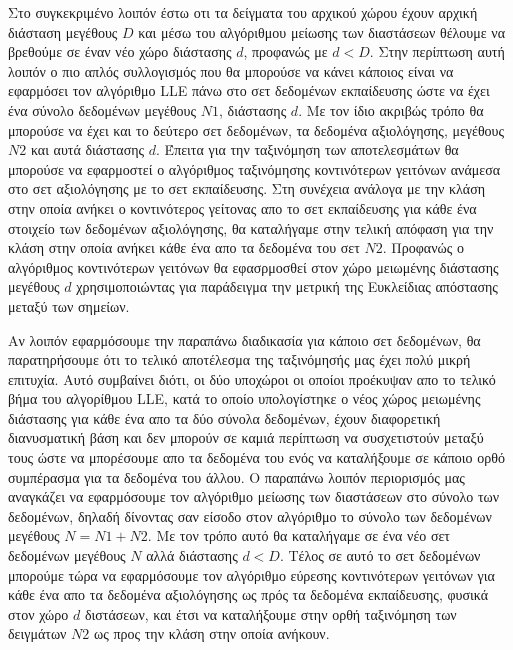 \par
Στο συγκεκριμένο λοιπόν έστω οτι τα δείγματα του αρχικού χώρου έχουν αρχική διάσταση μεγέθους $D$ και μέσω του αλγόριθμου μείωσης των διαστάσεων θέλουμε να βρεθούμε σε έναν νέο χώρο διάστασης $d$, προφανώς με $d < D$. Στην περίπτωση αυτή λοιπόν ο πιο απλός συλλογισμός που θα μπορούσε να κάνει κάποιος είναι να εφαρμόσει τον αλγόριθμο \textlatin{LLE} πάνω στο σετ δεδομένων εκπαίδευσης ώστε να έχει ένα σύνολο δεδομένων μεγέθους $Ν1$, διάστασης $d$. Με τον ίδιο ακριβώς τρόπο θα μπορούσε να έχει και το δεύτερο σετ δεδομένων, τα δεδομένα αξιολόγησης, μεγέθους $N2$ και αυτά διάστασης $d$. Έπειτα για την ταξινόμηση των αποτελεσμάτων θα μπορούσε να εφαρμοστεί ο αλγόριθμος ταξινόμησης κοντινότερων γειτόνων ανάμεσα στο σετ αξιολόγησης με το σετ εκπαίδευσης. Στη συνέχεια ανάλογα με την κλάση στην οποία ανήκει ο κοντινότερος γείτονας απο το σετ εκπαίδευσης για κάθε ένα στοιχείο των δεδομένων αξιολόγησης, θα καταλήγαμε στην τελική απόφαση για την κλάση στην οποία ανήκει κάθε ένα απο τα δεδομένα του σετ $N2$. Προφανώς ο αλγόριθμος κοντινότερων γειτόνων θα εφασρμοσθεί στον χώρο μειωμένης διάστασης μεγέθους $d$ χρησιμοποιώντας για παράδειγμα την μετρική της Ευκλείδιας απόστασης μεταξύ των σημείων.
\par
Αν λοιπόν εφαρμόσουμε την παραπάνω διαδικασία για κάποιο σετ δεδομένων, θα παρατηρήσουμε ότι το τελικό αποτέλεσμα της ταξινόμησής μας έχει πολύ μικρή επιτυχία. Αυτό συμβαίνει διότι, οι δύο υποχώροι οι οποίοι προέκυψαν απο το τελικό βήμα του αλγορίθμου \textlatin{LLE}, κατά το οποίο υπολογίστηκε ο νέος χώρος μειωμένης διάστασης για κάθε ένα απο τα δύο σύνολα δεδομένων, έχουν διαφορετική διανυσματική βάση και δεν μπορούν σε καμιά περίπτωση να συσχετιστούν μεταξύ τους ώστε να μπορέσουμε απο τα δεδομένα του ενός να καταλήξουμε σε κάποιο ορθό συμπέρασμα για τα δεδομένα του άλλου. Ο παραπάνω λοιπόν περιορισμός μας αναγκάζει να εφαρμόσουμε τον αλγόριθμο μείωσης των διαστάσεων στο σύνολο των δεδομένων, δηλαδή δίνοντας σαν είσοδο στον αλγόριθμο το σύνολο των δεδομένων μεγέθους $N = N1+N2$. Με τον τρόπο αυτό θα καταλήγαμε σε ένα νέο σετ δεδομένων μεγέθους $N$ αλλά διάστασης $d < D$. Τέλος σε αυτό το σετ δεδομένων μπορούμε τώρα να εφαρμόσουμε τον αλγόριθμο εύρεσης κοντινότερων γειτόνων για κάθε ένα απο τα δεδομένα αξιολόγησης ως πρός τα δεδομένα εκπαίδευσης, φυσικά στον χώρο $d$ διστάσεων, και έτσι να καταλήξουμε στην ορθή ταξινόμηση των δειγμάτων $N2$ ως προς την κλάση στην οποία ανήκουν. 

